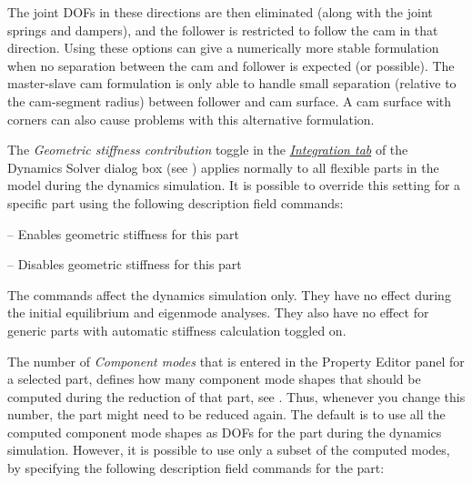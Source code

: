 
\noindent
The joint DOFs in these directions are then eliminated (along with the
joint springs and dampers), and the follower is restricted to follow the
cam in that direction. Using these options can give a numerically more
stable formulation when no separation between the cam and follower is
expected (or possible). The master-slave cam formulation is only able to
handle small separation (relative to the cam-segment radius) between
follower and cam surface. A cam surface with corners can also cause
problems with this alternative formulation.




The {\sl Geometric stiffness contribution} toggle in the
\protect\hyperlink{integration-tab}{\sl Integration tab} of the Dynamics Solver
dialog box (see
)
applies normally to all flexible parts in the model during the dynamics
simulation. It is possible to override this setting for a specific part
using the following description field commands:

\medskip
{}
\tabto{45mm} -- Enables geometric stiffness for this part

\tabto{45mm} -- Disables geometric stiffness for this part
\medskip

\noindent
The commands affect the dynamics simulation only. They have no effect during the
initial equilibrium and eigenmode analyses. They also have no effect for
generic parts with automatic stiffness calculation toggled on.



The number of {\sl Component modes} that is entered in the Property Editor panel
for a selected part, defines how many component mode shapes that should be
computed during the reduction of that part, see
.
Thus, whenever you change this number, the part might need to be reduced again.
The default is to use all the computed component mode shapes as DOFs for the
part during the dynamics simulation. However, it is possible to use only a
subset of the computed modes, by specifying the following description field
commands for the part:

